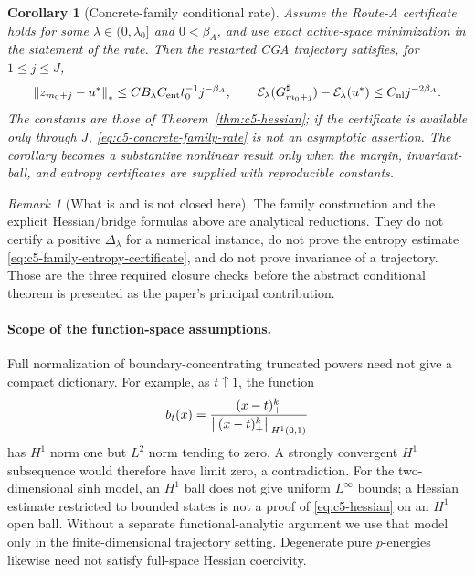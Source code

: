 \documentclass[11pt]{article}
\newtheorem{corollary}[theorem]{Corollary}
\theoremstyle{remark}
\newtheorem{remark}[theorem]{Remark}
\begin{document}
\begin{corollary}[Concrete-family conditional rate]
\label{cor:c5-concrete-family}
Assume the Route-A certificate holds for some $\lambda\in(0,\lambda_0]$
and $0<\beta_A$, and use exact active-space minimization in the statement
of the rate.  Then the restarted CGA trajectory satisfies, for
$1\leq j\leq J$,
\begin{equation}
 \left\lVert z_{m_0+j}-u^*\right\rVert_*
   \leq C B_\lambda C_{\rm ent}t_0^{-1}j^{-\beta_A},
 \qquad
 \mathcal E_\lambda(G_{m_0+j}^\sharp)-\mathcal E_\lambda(u^*)
   \leq C_{\rm nl}j^{-2\beta_A}.
 \label{eq:c5-concrete-family-rate}
\end{equation}
The constants are those of Theorem~\ref{thm:c5-hessian}; if the certificate
is available only through $J$, \eqref{eq:c5-concrete-family-rate} is not an
asymptotic assertion.  The corollary becomes a substantive nonlinear result
only when the margin, invariant-ball, and entropy certificates are supplied
with reproducible constants.
\end{corollary}

\begin{remark}[What is and is not closed here]
The family construction and the explicit Hessian/bridge formulas above are
analytical reductions.  They do not certify a positive $\Delta_\lambda$ for
a numerical instance, do not prove the entropy estimate
\eqref{eq:c5-family-entropy-certificate}, and do not prove invariance of a
trajectory.  Those are the three required closure checks before the abstract
conditional theorem is presented as the paper's principal contribution.
\end{remark}

\paragraph{Scope of the function-space assumptions.}
Full normalization of boundary-concentrating truncated powers need not
give a compact dictionary. For example, as $t\uparrow1$, the function
\[
 b_t(x)=\frac{(x-t)_+^k}{\left\lVert(x-t)_+^k\right\rVert_{H^1(0,1)}}
\]
has $H^1$ norm one
but $L^2$ norm tending to zero. A strongly convergent $H^1$ subsequence
would therefore have limit zero, a contradiction.
For the two-dimensional sinh model, an $H^1$ ball does not give
uniform $L^\infty$ bounds; a Hessian estimate restricted to bounded
states is not a proof of \eqref{eq:c5-hessian} on an $H^1$ open ball.
Without a separate functional-analytic argument we use that model only
in the finite-dimensional trajectory setting. Degenerate pure $p$-energies
likewise need not satisfy full-space Hessian coercivity.
\end{document}
